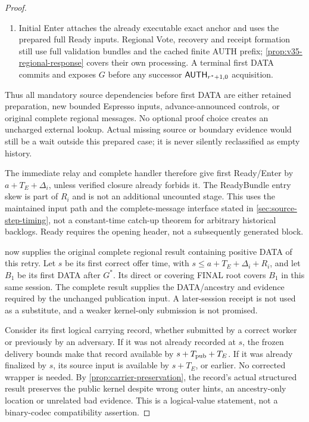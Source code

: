 \begin{proof}
\begin{enumerate}[label=(\roman*),itemsep=2pt]
required Espresso references are retained and checked for strict
precedence. No current-pair DATA transaction imports native state or
runs the separate $C_{\rm pub}$ execution/DA publication operation.
Those interfaces remain sound and separate.
\item Initial Enter attaches the already executable exact anchor and
uses the prepared full Ready inputs. Regional Vote, recovery and receipt
formation still use full validation bundles and the cached finite AUTH
prefix; \cref{prop:v35-regional-response} covers their own processing.
A terminal first DATA commits and exposes $G$ before any successor
$\mathsf{AUTH}_{r^*+1,0}$ acquisition.
\end{enumerate}
Thus all mandatory source dependencies before first DATA are either
retained preparation, new bounded Espresso inputs, advance-announced
controls, or original complete regional messages. No optional proof
choice creates an uncharged external lookup. Actual missing source or
boundary evidence would still be a wait outside this prepared case;
it is never silently reclassified as empty history.

The immediate  relay and complete handler therefore
give first Ready/Enter by $a+T_E+\Delta_i$, unless verified closure
already forbids it. The ReadyBundle entry skew is part of $R_i$ and is
not an additional uncounted stage. This uses the maintained input path
and the complete-message interface stated in
\cref{sec:source-step-timing}, not a constant-time catch-up theorem for
arbitrary historical backlogs. Ready requires the opening header, not
a subsequently generated block.

 now supplies the original complete
regional result containing positive DATA of this retry. Let $s$ be its
first correct offer time, with
$s\le a+T_E+\Delta_i+R_i$, and let $B_1$ be its first DATA after $G^*$.
Its direct or covering FINAL root covers $B_1$ in this same session.
The complete result supplies the DATA/ancestry and evidence required by
the unchanged publication input. A later-session receipt is not used
as a substitute, and a weaker kernel-only submission is not promised.

Consider its first logical carrying record, whether submitted by a
correct worker or previously by an adversary. If it was not already
recorded at $s$, the frozen delivery bounds make that record available
by $s+T_{\rm pub}+T_E$. If it was already finalized by $s$, its source
input is available by $s+T_E$, or earlier. No corrected wrapper is
needed. By \cref{prop:carrier-preservation}, the record's actual
structured result preserves the public kernel despite wrong outer
hints, an ancestry-only location or unrelated bad evidence. This is a
logical-value statement, not a binary-codec compatibility assertion.


\end{proof}
